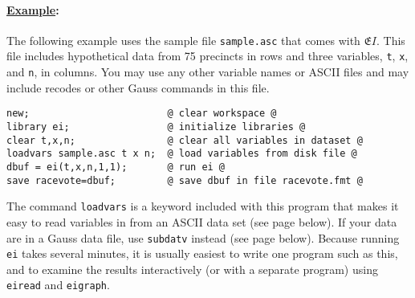 \documentclass[11pt,titlepage]{article}
\newcommand{\EI}{\ensuremath{{\mathfrak EI}}}
\begin{document}
\paragraph{\underline{Example}:}
The following example uses the sample file \texttt{sample.asc} that
comes with \EI.  This file includes hypothetical data from 75
precincts in rows and three variables, \texttt{t}, \texttt{x}, and
\texttt{n}, in columns.  You may use any other variable names or
ASCII files and may include recodes or other Gauss commands in this
file.
\begin{verbatim}
new;                        @ clear workspace @
library ei;                 @ initialize libraries @
clear t,x,n;                @ clear all variables in dataset @
loadvars sample.asc t x n;  @ load variables from disk file @
dbuf = ei(t,x,n,1,1);       @ run ei @
save racevote=dbuf;         @ save dbuf in file racevote.fmt @
\end{verbatim}
The command \texttt{loadvars} is a keyword included with this program
that makes it easy to read variables in from an ASCII data set (see
page \pageref{loadvars} below).  If your data are in a Gauss data
file, use \texttt{subdatv} instead (see page \pageref{subdatv} below).
Because running \texttt{ei} takes several minutes, it is usually
easiest to write one program such as this, and to examine the results
interactively (or with a separate program) using \texttt{eiread} and
\texttt{eigraph}.
\end{document}
